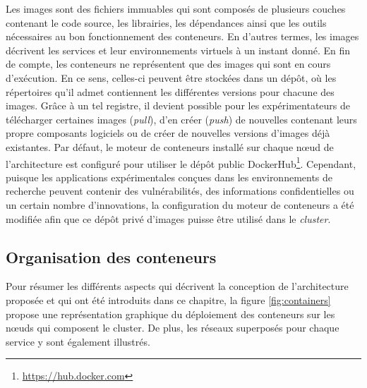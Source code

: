 Les images sont des fichiers immuables qui sont composés de plusieurs couches contenant le code source, les librairies, les dépendances ainsi que les outils nécessaires au bon fonctionnement des conteneurs. En d'autres termes, les images décrivent les services et leur environnements virtuels à un instant donné. En fin de compte, les conteneurs ne représentent que des images qui sont en cours d'exécution. En ce sens, celles-ci peuvent être stockées dans un dépôt, où les répertoires qu'il admet contiennent les différentes versions pour chacune des images. Grâce à un tel registre, il devient possible pour les expérimentateurs de télécharger certaines images (\textit{pull}), d'en créer (\textit{push}) de nouvelles contenant leurs propre composants logiciels ou de créer de nouvelles versions d'images déjà existantes. Par défaut, le moteur de conteneurs installé sur chaque n\oe{}ud de l'architecture est configuré pour utiliser le dépôt public DockerHub\footnote{\url{https://hub.docker.com}}. Cependant, puisque les applications expérimentales conçues dans les environnements de recherche peuvent contenir des vulnérabilités, des informations confidentielles ou un certain nombre d'innovations, la configuration du moteur de conteneurs a été modifiée afin que ce dépôt privé d'images puisse être utilisé dans le \textit{cluster}.

\subsection{Organisation des conteneurs}
\label{sec:cont_org}

Pour résumer les différents aspects qui décrivent la conception de l'architecture proposée et qui ont été introduits dans ce chapitre, la figure \ref{fig:containers} propose une représentation graphique du déploiement des conteneurs sur les n\oe{}uds qui composent le cluster. De plus, les réseaux superposés pour chaque service y sont également illustrés.

